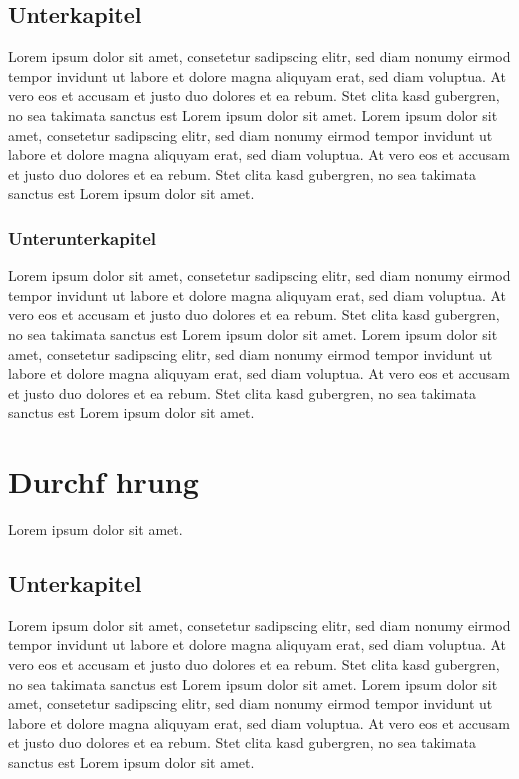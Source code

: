 \documentclass{article}
\begin{document}
\section{Unterkapitel}
\label{sec:u1}
Lorem ipsum dolor sit amet, consetetur sadipscing elitr, sed diam nonumy eirmod tempor invidunt ut labore et dolore magna aliquyam erat, sed diam voluptua. At vero eos et accusam et justo duo dolores et ea rebum. Stet clita kasd gubergren, no sea takimata sanctus est Lorem ipsum dolor sit amet. Lorem ipsum dolor sit amet, consetetur sadipscing elitr, sed diam nonumy eirmod tempor invidunt ut labore et dolore magna aliquyam erat, sed diam voluptua. At vero eos et accusam et justo duo dolores et ea rebum. Stet clita kasd gubergren, no sea takimata sanctus est Lorem ipsum dolor sit amet.

\subsection{Unterunterkapitel}
\label{sec:u2}
Lorem ipsum dolor sit amet, consetetur sadipscing elitr, sed diam nonumy eirmod tempor invidunt ut labore et dolore magna aliquyam erat, sed diam voluptua. At vero eos et accusam et justo duo dolores et ea rebum. Stet clita kasd gubergren, no sea takimata sanctus est Lorem ipsum dolor sit amet. Lorem ipsum dolor sit amet, consetetur sadipscing elitr, sed diam nonumy eirmod tempor invidunt ut labore et dolore magna aliquyam erat, sed diam voluptua. At vero eos et accusam et justo duo dolores et ea rebum. Stet clita kasd gubergren, no sea takimata sanctus est Lorem ipsum dolor sit amet.


\chapter{Durchf hrung}
\label{chap:durchf hrung}
Lorem ipsum dolor sit amet.

\section{Unterkapitel}
\label{sec:u3}
Lorem ipsum dolor sit amet, consetetur sadipscing elitr, sed diam nonumy eirmod tempor invidunt ut labore et dolore magna aliquyam erat, sed diam voluptua. At vero eos et accusam et justo duo dolores et ea rebum. Stet clita kasd gubergren, no sea takimata sanctus est Lorem ipsum dolor sit amet. Lorem ipsum dolor sit amet, consetetur sadipscing elitr, sed diam nonumy eirmod tempor invidunt ut labore et dolore magna aliquyam erat, sed diam voluptua. At vero eos et accusam et justo duo dolores et ea rebum. Stet clita kasd gubergren, no sea takimata sanctus est Lorem ipsum dolor sit amet.
\end{document}
